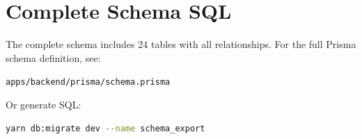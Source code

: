 \section{Complete Schema SQL}
\label{sec:schema-complete-sql}

\begin{infobox}
The complete schema includes 24 tables with all relationships. For the full Prisma schema definition, see:

\texttt{apps/backend/prisma/schema.prisma}

Or generate SQL:
\begin{lstlisting}[language=bash]
yarn db:migrate dev --name schema_export
\end{lstlisting}
\end{infobox}
